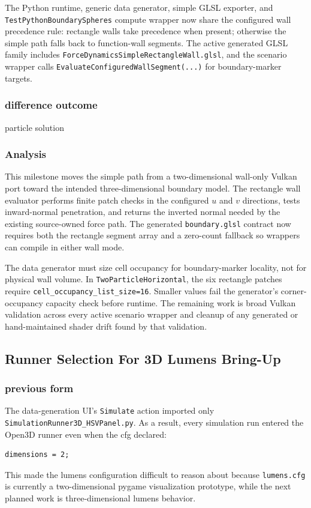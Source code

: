 The Python runtime, generic data generator, simple GLSL exporter, and
\texttt{TestPythonBoundarySpheres} compute wrapper now share the configured
wall precedence rule: rectangle walls take precedence when present; otherwise
the simple path falls back to function-wall segments.  The active generated
GLSL family includes \texttt{ForceDynamicsSimpleRectangleWall.glsl}, and the
scenario wrapper calls \texttt{EvaluateConfiguredWallSegment(...)} for
boundary-marker targets.

\subsubsection{difference outcome}

particle solution

\subsubsection{Analysis}

This milestone moves the simple path from a two-dimensional wall-only Vulkan
port toward the intended three-dimensional boundary model.  The rectangle
wall evaluator performs finite patch checks in the configured \(u\) and \(v\)
directions, tests inward-normal penetration, and returns the inverted normal
needed by the existing source-owned force path.  The generated
\texttt{boundary.glsl} contract now requires both the rectangle segment array
and a zero-count fallback so wrappers can compile in either wall mode.

The data generator must size cell occupancy for boundary-marker locality, not
for physical wall volume.  In \texttt{TwoParticleHorizontal}, the six
rectangle patches require \texttt{cell\_occupancy\_list\_size=16}.  Smaller
values fail the generator's corner-occupancy capacity check before runtime.
The remaining work is broad Vulkan validation across every active scenario
wrapper and cleanup of any generated or hand-maintained shader drift found by
that validation.

\subsection{Runner Selection For 3D Lumens Bring-Up}

\subsubsection{previous form}

The data-generation UI's \texttt{Simulate} action imported only
\texttt{SimulationRunner3D\_HSVPanel.py}.  As a result, every simulation run
entered the Open3D runner even when the cfg declared:
\begin{verbatim}
dimensions = 2;
\end{verbatim}
This made the lumens configuration difficult to reason about because
\texttt{lumens.cfg} is currently a two-dimensional pygame visualization
prototype, while the next planned work is three-dimensional lumens behavior.

